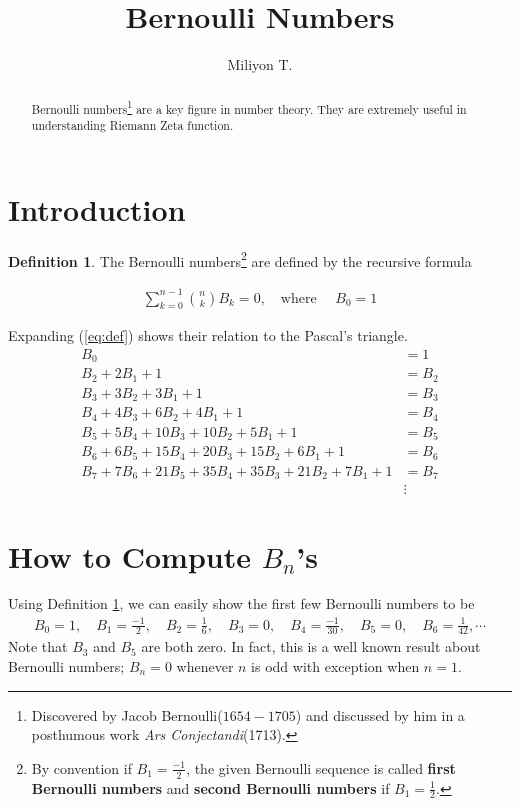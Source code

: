\documentclass{article}
\theoremstyle{definition}
\newtheorem{defn}[thm]{Definition}
\begin{document}
\title{Bernoulli Numbers}
\author{Miliyon T.}%
\maketitle
\tableofcontents
\begin{abstract}
  Bernoulli numbers\footnote{Discovered by Jacob Bernoulli($1654-1705$) and discussed by him in a posthumous work \textit{Ars Conjectandi}(1713).} are a key figure in number theory. They are extremely useful in understanding Riemann Zeta function. %
\end{abstract}
\section{Introduction}

\begin{defn}\label{defb}
The Bernoulli numbers\footnote{By convention if $B_1=\frac{-1}{2}$, the given Bernoulli sequence is called \textbf{first Bernoulli numbers} and \textbf{second Bernoulli numbers} if $B_1=\frac{1}{2}$.} are defined by the recursive formula

\begin{align}\label{eq:def}
\sum_{k=0}^{n-1}\binom{n}{k}B_k=0,\quad \mbox{where }\quad  B_0=1
\end{align}
\end{defn}
Expanding (\ref{eq:def}) shows their relation to the Pascal's triangle.
\begin{align*}
B_0&=1\\
B_2+2B_1+1&=B_2\\
B_3+3B_2+  3B_1+1&=B_3\\
B_4  +4B_3+6B_2+  4B_1+1&=B_4\\
B_5+5B_4  +10B_3+10B_2+ 5B_1+1&=B_5\\
B_6+ 6B_5+ 15B_4+ 20B_3+ 15B_2+ 6B_1+1&=B_6\\
B_7+7B_6+21B_5+35B_4+35B_3+21B_2+7B_1+ 1&=B_7\\
&\vdots
\end{align*}

\section{How to Compute $B_n$'s}
Using Definition \ref{defb}, we can easily show the first few Bernoulli numbers to be
\begin{align*}
B_0=1,\quad B_1=\frac{-1}{2},\quad B_2=\frac {1}{6},\quad B_3 = 0,\quad B_4 =\frac{-1}{30},\quad B_5 = 0,\quad B_6 =\frac{1}{42},\cdots
\end{align*}
Note that $B_3$ and $B_5$ are both zero. In fact, this is a well known result about Bernoulli numbers; $B_n=0$ whenever $n$ is odd with exception when $n=1$.
\end{document}
